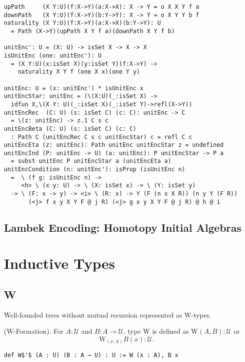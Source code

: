 \documentclass{article}
\begin{document}
\begin{lstlisting}[mathescape=true]
upPath     (X Y:U)(f:X->Y)(a:X->X): X -> Y = o X X Y f a
downPath   (X Y:U)(f:X->Y)(b:Y->Y): X -> Y = o X Y Y b f
naturality (X Y:U)(f:X->Y)(a:X->X)(b:Y->Y): U
  = Path (X->Y)(upPath X Y f a)(downPath X Y f b)

unitEnc': U = (X: U) -> isSet X -> X -> X
isUnitEnc (one: unitEnc'): U
  = (X Y:U)(x:isSet X)(y:isSet Y)(f:X->Y) ->
    naturality X Y f (one X x)(one Y y)

unitEnc: U = (x: unitEnc') * isUnitEnc x
unitEncStar: unitEnc = (\(X:U)(_:isSet X) ->
  idfun X,\(X Y: U)(_:isSet X)(_:isSet Y)->refl(X->Y))
unitEncRec  (C: U) (s: isSet C) (c: C): unitEnc -> C
  = \(z: unitEnc) -> z.1 C s c
unitEncBeta (C: U) (s: isSet C) (c: C)
  : Path C (unitEncRec C s c unitEncStar) c = refl C c
unitEncEta (z: unitEnc): Path unitEnc unitEncStar z = undefined
unitEncInd (P: unitEnc -> U) (a: unitEnc): P unitEncStar -> P a
  = subst unitEnc P unitEncStar a (unitEncEta a)
unitEncCondition (n: unitEnc'): isProp (isUnitEnc n)
  =  \ (f g: isUnitEnc n) ->
     <h> \ (x y: U) -> \ (X: isSet x) -> \ (Y: isSet y)
  -> \ (F: x -> y) -> <i> \ (R: x) -> Y (F (n x X R)) (n y Y (F R))
       (<j> f x y X Y F @ j R) (<j> g x y X Y F @ j R) @ h @ i
\end{lstlisting}

\subsection{Lambek Encoding: Homotopy Initial Algebras}

\newpage
\section{Inductive Types}

\subsection{W}

Well-founded trees without mutual recursion represented as $\mathrm{W}$-types.

\begin{definition} ($\mathrm{W}$-Formation).
For $A : \mathcal{U}$ and $B : A \rightarrow \mathcal{U}$, type $\mathrm{W}$
is defined as $\mathrm{W}(A,B) : \mathcal{U}$ or
$$
   \mathrm{W}_{(x : A)} B(x) : \mathcal{U}.
$$
\begin{lstlisting}[mathescape=true]
def W$'$ (A : U) (B : A → U) : U := W (x : A), B x
\end{lstlisting}
\end{definition}
\end{document}
